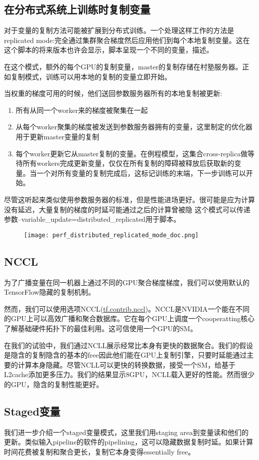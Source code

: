 \subsection{在分布式系统上训练时复制变量}
对于变量的复制方法可能被扩展到分布式训练。一个处理这样工作的方法是replicated mode:完全通过集群聚合梯度然后应用他们到每个本地复制变量。这在这个脚本的将来版本也许会显示，脚本呈现一个不同的变量，描述。

在这个模式，额外的每个GPU的复制变量，master的复制存储在村塾服务器。正如复制模式，训练可以用本地的复制的变量立即开始。

当权重的梯度可用的时候，他们送回参数服务器所有的本地复制被更新:
\begin{enumerate}
	\item 所有从同一个worker来的梯度被聚集在一起
	\item 从每个worker聚集的梯度被发送到参数服务器拥有的变量，这里制定的优化器用于更新master变量的复制
	\item 每个worker更新它从master复制的变量。在例程模型，这集合cross-replica做等待所有workers完成更新变量，仅仅在所有复制的障碍被释放后获取新的变量。当一个对所有变量的复制完成后，这标记训练的末端，下一步训练可以开始。
\end{enumerate}
尽管这听起来类似使用参数服务器的标准，但是性能进场更好。很可能是应为计算没有延迟，大量复制的梯度的时延可能通过之后的计算曾被隐
这个模式可以传递参数--variable\_update=distributed\_replicated用于脚本。
\begin{figure}[H]
	\centering
	\texttt{[image: perf\_distributed\_replicated\_mode\_doc.png]}
\end{figure}
\subsection{NCCL}
为了广播变量在同一机器上通过不同的GPU聚合梯度梯度，我们可以使用默认的TensorFlow隐藏的复制机制。

然而，我们可以使用选项NCCL(\href{https://www.tensorflow.org/api_docs/python/tf/contrib/nccl}{tf.contrib.nccl})。NCCL是NVIDIA一个能在不同的GPU上可以高效广播和聚合数据库。它在每个GPU上调度一个cooperatting核心了解基础硬件拓扑下的最佳利用。这可信使用一个GPU的SM。

在我们的试验中，我们通过NCLL展示经常比本身有更快的数据聚合。我们的假设是隐含的复制隐含的基本的free因此他们能在GPU上复制引擎，只要时延能通过主要的计算本身隐藏。尽管NCLL可以更快的转换数据，接受一个SM，给基于L2cache添加更多压力。我们的结果显示8GPU，NCLL载入更好的性能。然而很少的GPU，隐含的复制性能更好。
\subsection{Staged变量}
我们进一步介绍一个staged变量模式，这里我们用staging area到变量读和他们的更新。类似输入pipeline的软件的pipelining，这可以隐藏数据复制时延。如果计算时间花费被复制和聚合更长，复制它本身变得essentially free。

